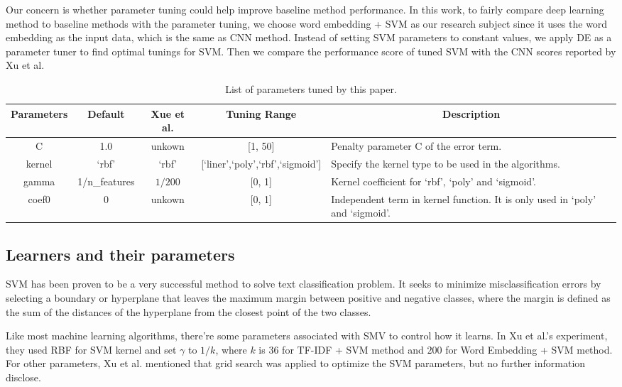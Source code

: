Our concern is whether parameter tuning could help improve baseline method performance.
In this work, to fairly compare deep learning method to baseline methods with the parameter tuning,
we choose word embedding + SVM as our research subject since it uses the word embedding as the
input data, which is the same as CNN method. 
Instead of setting SVM parameters to constant values, we apply DE as a parameter tuner to find optimal tunings
for SVM. Then we compare the performance score of tuned SVM  with the CNN scores reported by Xu et al. 

\begin{table*}[t!]
 \small
  \centering
	\begin{tabular}{|c|c|c|c|l|}
	\cline{1-5}
	Parameters & Default &Xue et al.&Tuning Range& 
\multicolumn{1}{c|}{Description} \\ \hline
	C & 1.0 &unkown&[1, 50]& Penalty parameter C of the error term.\\ \cline{1-5} 
	 kernel & `rbf' &`rbf'&[`liner',`poly',`rbf',`sigmoid']& Specify the kernel type to be used in the algorithms. \\ \cline{1-5} 
	 gamma & {1/n\_features} &$1/200$& [0, 1]& Kernel coefficient for `rbf', `poly' and `sigmoid'. \\ \cline{1-5} 
	 coef0 & 0 & unkown & [0, 1] &  Independent term in kernel function. It is only used in `poly' and `sigmoid'. \\ \cline{1-5}
\hline
	\end{tabular}
    \caption {List of parameters tuned by this paper.}
\label{tab:parameters}
\end{table*}

\subsection{Learners and their parameters}
SVM has been proven to be a very successful method to solve
text classification problem. It seeks to minimize misclassification
errors by selecting a boundary or hyperplane that leaves
the maximum margin between positive and negative classes, where the
margin is defined as the sum of the distances of the
hyperplane from the closest point of the two classes\cite{joachims1998text}.

Like most machine learning algorithms, there're some parameters associated with
SMV to control how it learns.  In Xu et al.'s experiment, they used RBF for SVM kernel
and set $\gamma$ to $1/k$, where $k$ is $36$ for TF-IDF + SVM method
and $200$ for Word Embedding + SVM method. For other parameters, 
Xu et al. mentioned that grid search was applied to optimize the SVM parameters, 
but no further information disclose. 

